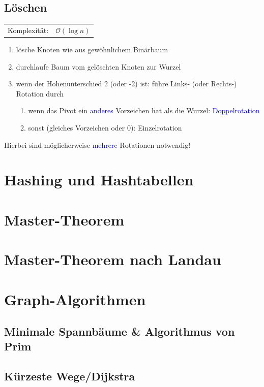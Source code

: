 \documentclass[12pt,a4paper]{article}
\begin{document}
\subsection{Löschen}
\begin{tabularx}{\textwidth}{l l}
	Komplexität: &$\mathcal{O}(\log n)$\\
\end{tabularx}
\begin{enumerate}
	\item lösche Knoten wie aus gewöhnlichem Binärbaum
	\item durchlaufe Baum vom gelöschten Knoten zur Wurzel
	\item wenn der Hohenunterschied 2 (oder -2) ist: führe Links- (oder Rechts-) Rotation durch
	\begin{enumerate}
		\item wenn das Pivot ein \textcolor{blue}{anderes} Vorzeichen hat als die Wurzel: \textcolor{blue}{Doppelrotation}
		\item sonst (gleiches Vorzeichen oder 0): Einzelrotation
	\end{enumerate}
\end{enumerate}
Hierbei sind möglicherweise \textcolor{blue}{mehrere} Rotationen notwendig!

\section{Hashing und Hashtabellen}


\section{Master-Theorem}


\section{Master-Theorem nach Landau}
\label{sec:MasterLandau}


\section{Graph-Algorithmen}
\subsection{Minimale Spannbäume \& Algorithmus von Prim}


\subsection{Kürzeste Wege/Dijkstra}
\end{document}
